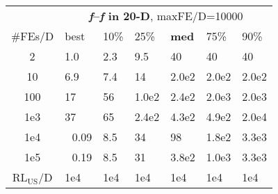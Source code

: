 \begin{tabular}{c|llllll}
 & \multicolumn{6}{|c}{\textbf{\textit{f}\raisebox{-0.35ex}{1}--\textit{f}\raisebox{-0.35ex}{24} in 20-D}, maxFE/D=10000}\\
\#FEs/D & best & 10\% & 25\% & \textbf{med} & 75\% & 90\%\\
2 & \hspace*{1ex}1.0 & \hspace*{1ex}2.3 & \hspace*{1ex}9.5 & 40 & 40 & 40\\
10 & \hspace*{1ex}6.9 & \hspace*{1ex}7.4 & 14 & 2.0e2 & 2.0e2 & 2.0e2\\
100 & 17 & 56 & 1.0e2 & 2.4e2 & 2.0e3 & 2.0e3\\
1e3 & 37 & 65 & 2.4e2 & 4.3e2 & 4.9e2 & 2.0e4\\
1e4 & ~\,0.09 & \hspace*{1ex}8.5 & 34 & 98 & 1.8e2 & 3.3e3\\
1e5 & ~\,0.19 & \hspace*{1ex}8.5 & 31 & 3.8e2 & 1.0e3 & 3.3e3\\
$\text{RL}_{\text{US}}$/D & 1e4 & 1e4 & 1e4 & 1e4 & 1e4 & 1e4
\end{tabular}
